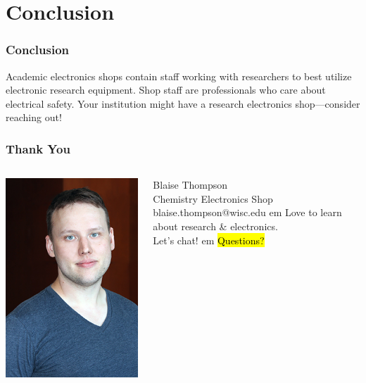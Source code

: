 \documentclass{presentation}
\begin{document}
\section{Conclusion}

\begin{frame}\frametitle{Conclusion}
  Academic electronics shops contain staff working with researchers to best utilize electronic research equipment.
  \vfill
  Shop staff are professionals who care about electrical safety.
  \vfill
  Your institution might have a research electronics shop---consider reaching out!
\end{frame}

\begin{frame}\frametitle{Thank You}
  \begin{columns}
    \begin{column}{0.33\textwidth}
      \includegraphics[width=\textwidth]{"./Thompson_Blaise_LowRes.jpg"}
    \end{column}
    \begin{column}{0.67\textwidth}
      Blaise Thompson \\
      Chemistry Electronics Shop \\
      blaise.thompson@wisc.edu
       em
      Love to learn about research \& electronics.\\
      Let's chat!
       em
      \hl{Questions?}
    \end{column}
  \end{columns}
\end{frame}
\end{document}
